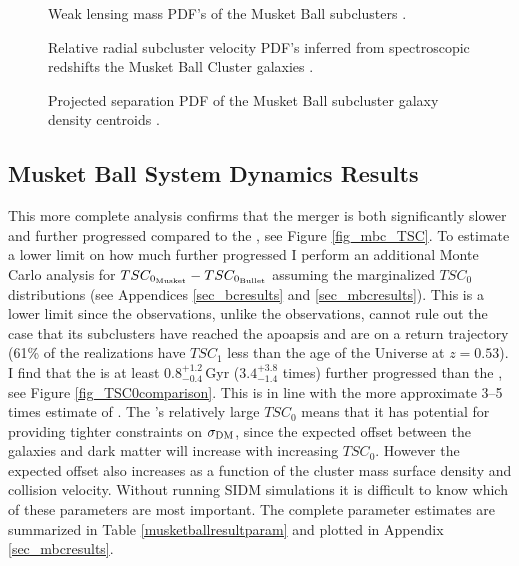 \documentclass[12pt]{emulateapj}
\begin{document}
\begin{figure}
\caption{Weak lensing mass PDF's of the Musket Ball subclusters \citep{Dawson:2012dl}. 
\label{musket_massinput}}
\end{figure}

\begin{figure}
\caption{Relative radial subcluster velocity PDF's inferred from spectroscopic redshifts the Musket Ball Cluster galaxies  \citep{Dawson:2012dl}. 
\label{musket_vinput}}
\end{figure}

\begin{figure}
\caption{Projected separation PDF of the Musket Ball subcluster galaxy density centroids \citep{Dawson:2012dl}. 
\label{musket_projinput}}
\end{figure}

\subsection{Musket Ball System Dynamics Results}

This more complete analysis confirms that the  merger is both significantly slower and further progressed compared to the , see Figure \ref{fig_mbc_TSC}.
To estimate a lower limit on how much further progressed I perform an additional Monte Carlo analysis  for $TSC_{\rm 0_{Musket}}-TSC_{\rm 0_{Bullet}}$ assuming the marginalized $TSC_0$ distributions (see Appendices \ref{sec_bcresults} and \ref{sec_mbcresults}).
This is a lower limit since the  observations, unlike the  observations, cannot rule out the case that its subclusters have reached the apoapsis and are on a return trajectory (61\% of the realizations have $TSC_1$ less than the age of the Universe at $z=0.53$).
I find that  the  is at least $0.8^{+1.2}_{-0.4}$\,Gyr ($3.4^{+3.8}_{-1.4}$ times) further progressed than the , see Figure \ref{fig_TSC0comparison}.
This is in line with the more approximate 3--5 times estimate of \citet{Dawson:2012dl}.
The 's relatively large $TSC_0$ means that it has potential for providing tighter constraints on $\sigma_{\rm DM}$, since the expected offset between the galaxies and dark matter will increase with increasing $TSC_0$.
However the expected offset also increases as a function of the cluster mass surface density and collision velocity.
Without running SIDM simulations it is difficult to know which of these parameters are most important.
The complete  parameter estimates are summarized in Table \ref{musketballresultparam} and plotted in Appendix \ref{sec_mbcresults}.
\end{document}

